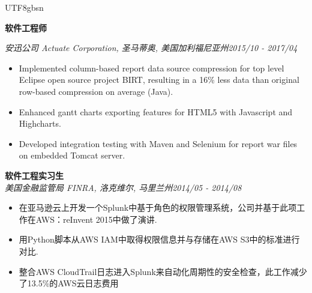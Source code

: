 \documentclass[3pt]{article}
\newenvironment{changemargin}[2]{%
  \begin{list}{}{%
    \setlength{\topsep}{0pt}%
    \setlength{\leftmargin}{#1}%
    \setlength{\rightmargin}{#2}%
    \setlength{\listparindent}{\parindent}%
    \setlength{\itemindent}{\parindent}%
    \setlength{\parsep}{\parskip}%
  }%
  \item[]}{\end{list}
}
\newenvironment{body} {
	\vspace*{-16pt}
	\begin{changemargin}{-0.25in}{-0.5in}
  }	
	{\end{changemargin}
}
\begin{document}
\begin{CJK}{UTF8}{gbsn}
\begin{body}
    \textbf{软件工程师} \\
   \vspace{1pt}

    \emph{安迅公司 Actuate Corporation, 圣马蒂奥, 美国加利福尼亚州}\hfill \emph{2015/10 - 2017/04}\\
     \begin{itemize} \itemsep -0.5pt
    \item{Implemented column-based report data source compression for top level Eclipse open source project BIRT, resulting in a 16\% less data than original row-based compression on average (Java).}
     \item {Enhanced gantt charts exporting features for HTML5 with Javascript and Highcharts. } 
     \item {Developed integration testing with Maven and Selenium for report war files on embedded Tomcat server. } 
       \end{itemize}
	
   \vspace{5pt}

    \textbf{软件工程实习生} \\

    \emph{美国金融监管局 FINRA, 洛克维尔, 马里兰州}\hfill \emph{2014/05 - 2014/08}\\
     \begin{itemize} \itemsep -0.5pt
    \item{在亚马逊云上开发一个Splunk中基于角色的权限管理系统，公司并基于此项工作在AWS：reInvent 2015中做了演讲.}
     \item {用Python脚本从AWS IAM中取得权限信息并与存储在AWS S3中的标准进行对比.}
     \item {整合AWS CloudTrail日志进入Splunk来自动化周期性的安全检查，此工作减少了13.5\%的AWS云日志费用}
   
    \end{itemize}
	

\end{body}
\end{CJK}
\end{document}
